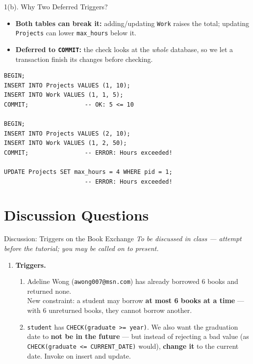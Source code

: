 \documentclass{beamer}
\begin{document}
\begin{frame}[fragile]{1(b). Why Two Deferred Triggers?}
\small
\begin{itemize}
  \item \textbf{Both tables can break it:} adding/updating \texttt{Work} raises the total; updating \texttt{Projects} can lower \texttt{max\_hours} below it.
  \item \textbf{Deferred to \texttt{COMMIT}:} the check looks at the \emph{whole} database, so we let a transaction finish its changes before checking.
\end{itemize}
\begin{lstlisting}[language=plpgsql]
BEGIN;
INSERT INTO Projects VALUES (1, 10);
INSERT INTO Work VALUES (1, 1, 5);
COMMIT;                -- OK: 5 <= 10

BEGIN;
INSERT INTO Projects VALUES (2, 10);
INSERT INTO Work VALUES (1, 2, 50);
COMMIT;                -- ERROR: Hours exceeded!

UPDATE Projects SET max_hours = 4 WHERE pid = 1;
                       -- ERROR: Hours exceeded!
\end{lstlisting}
\end{frame}

\section{Discussion Questions}

\begin{frame}{Discussion: Triggers on the Book Exchange}
\small
\textit{To be discussed in class --- attempt before the tutorial; you may be called on to present.}
\begin{enumerate}
  \item[\textbf{2.}] \textbf{Triggers.}
  \begin{enumerate}
    \item[(a)] Adeline Wong (\texttt{awong007@msn.com}) has already borrowed 6 books and returned none.\\
    New constraint: a student may borrow \textbf{at most 6 books at a time} --- with 6 unreturned books, they cannot borrow another.
    \item[(b)] \texttt{student} has \texttt{CHECK(graduate >= year)}. We also want the graduation date to \textbf{not be in the future} --- but instead of rejecting a bad value (as \texttt{CHECK(graduate <= CURRENT\_DATE)} would), \textbf{change it} to the current date. Invoke on insert and update.
  \end{enumerate}
\end{enumerate}
\end{frame}
\end{document}
